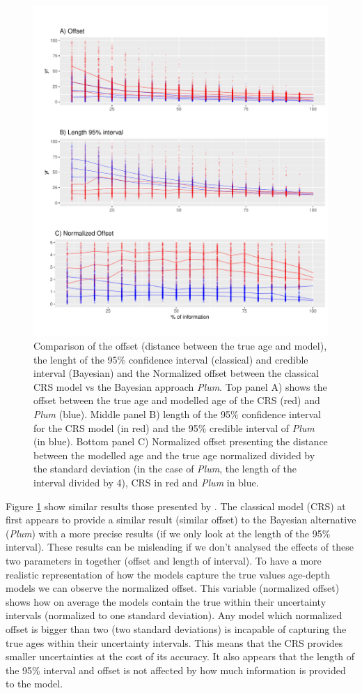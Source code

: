 \documentclass [10pt] {article}
\begin{document}
\begin{figure}[!]
 \centering
  \includegraphics[width=.75\linewidth]{AccPrec.pdf}
	\caption{Comparison of the offset (distance between the true age and model), the lenght of the 95\% confidence interval (classical) and credible interval (Bayesian) and the Normalized offset between the classical CRS model vs the Bayesian approach \textit{Plum}. Top panel A) shows the offset between the true age and modelled age of the CRS (red) and \textit{Plum} (blue). Middle panel B) length of the 95\% confidence interval for the CRS model (in red) and the 95\% credible interval of \textit{Plum} (in blue). Bottom panel C) Normalized offset presenting the distance between the modelled age and the true age normalized divided by the standard deviation (in the case of \textit{Plum}, the length of the interval divided by 4), CRS in red and \textit{Plum} in blue.    }
  \label{fig:accpre}
\end{figure}

Figure \ref{fig:accpre} show similar results those presented by \cite{Blaauw2018}. 
The classical model (CRS) at first appears to provide a similar result (similar offset) to the Bayesian alternative (\textit{Plum}) with a more precise results (if we only look at the length of the 95\% interval). 
These results can be misleading if we don't analysed the effects of these two parameters in together (offset and length of interval). 
To have a more realistic representation of how the models capture the true values age-depth models we can observe the normalized offset. 
This variable (normalized offset) shows how on average the models contain the true within their uncertainty intervals (normalized to one standard deviation). 
Any model which normalized offset is bigger than two (two standard deviations) is incapable of capturing the true ages within their uncertainty intervals.  
This means that the CRS provides smaller uncertainties at the cost of its accuracy.
It also appears that the length of the 95\% interval and offset is not affected by how much information is provided to the model. 
\end{document}
